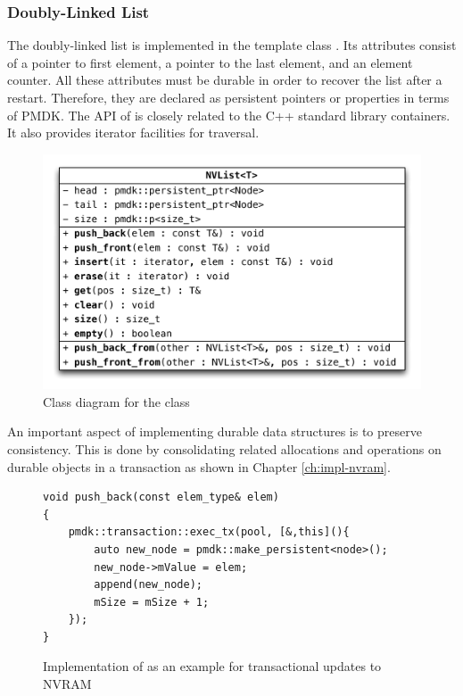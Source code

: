 \subsubsection{Doubly-Linked List}

The doubly-linked list is implemented in the template class . Its
attributes consist of a pointer to first element, a pointer to the last element,
and an element counter. All these attributes must be durable in order to recover
the list after a restart. Therefore, they are declared as persistent pointers or
properties in terms of PMDK. The API of  is closely related to the
C++ standard library containers. It also provides iterator facilities for
traversal.

\begin{figure}[h!]
    \centering
    \includegraphics[scale=0.66]{figures/impl/list.pdf}
    \caption{Class diagram for the class }
    \label{fig:impl-list}
\end{figure}

An important aspect of implementing durable data structures is to preserve
consistency. This is done by consolidating related allocations and operations on
durable objects in a transaction as shown in Chapter \ref{ch:impl-nvram}.

\begin{figure}[h!]
\begin{lstlisting}
void push_back(const elem_type& elem)
{
    pmdk::transaction::exec_tx(pool, [&,this](){
        auto new_node = pmdk::make_persistent<node>();
        new_node->mValue = elem;
        append(new_node);
        mSize = mSize + 1;
    });
}
\end{lstlisting}
\caption{Implementation of  as an example for transactional updates to NVRAM}
\label{lst:impl-list-tx}
\end{figure}

